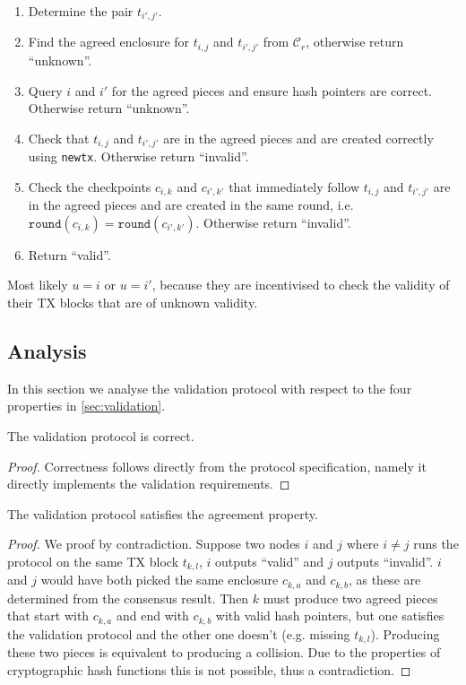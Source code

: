\begin{enumerate}
\item Determine the pair $t_{i', j'}$.
\item Find the agreed enclosure for $t_{i,j}$ and $t_{i', j'}$ from
  $\mathcal{C}_r$, otherwise return ``unknown''.
\item Query $i$ and $i'$ for the agreed pieces and ensure hash pointers are
  correct. Otherwise return ``unknown''.
\item Check that $t_{i,j}$ and $t_{i', j'}$ are in the agreed pieces and are
  created correctly using \texttt{newtx}. Otherwise return ``invalid''.
\item Check the checkpoints $c_{i, k}$ and $c_{i', k'}$ that immediately follow
  $t_{i,j}$ and $t_{i', j'}$ are in the agreed pieces and are created in the
  same round, i.e. $\texttt{round}(c_{i, k}) = \texttt{round}(c_{i', k'})$.
  Otherwise return ``invalid''.
\item Return ``valid''.
\end{enumerate}

Most likely $u = i$ or $u = i'$, because they are incentivised to check the
validity of their TX blocks that are of unknown validity.

\subsection{Analysis}
In this section we analyse the validation protocol with respect to the four
properties in \cref{sec:validation}.

\begin{lemma}
  The validation protocol is correct.
\end{lemma}
\begin{proof}
  Correctness follows directly from the protocol specification, namely it
  directly implements the validation requirements.
\end{proof}

\begin{lemma}
  The validation protocol satisfies the agreement property.
\end{lemma}
\begin{proof}
  We proof by contradiction. Suppose two nodes $i$ and $j$ where $i \ne j$ runs
  the protocol on the same TX block $t_{k, l}$, $i$ outputs ``valid'' and $j$
  outputs ``invalid''. $i$ and $j$ would have both picked the same enclosure
  $c_{k, a}$ and $c_{k, b}$, as these are determined from the consensus result.
  Then $k$ must produce two agreed pieces that start with $c_{k,a}$ and end with
  $c_{k, b}$ with valid hash pointers, but one satisfies the validation protocol
  and the other one doesn't (e.g. missing $t_{k, l}$). Producing these two
  pieces is equivalent to producing a collision. Due to the properties of
  cryptographic hash functions this is not possible, thus a contradiction.
\end{proof}

